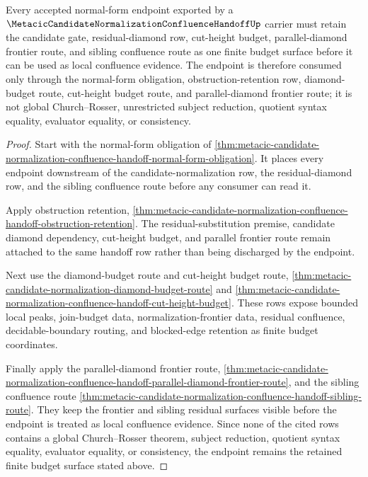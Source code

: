 \begin{theorem}
\label{thm:metacic-candidate-normalization-confluence-handoff-normal-form-budget}
Every accepted normal-form endpoint exported by a
$\MetacicCandidateNormalizationConfluenceHandoffUp$ carrier must retain the
candidate gate, residual-diamond row, cut-height budget, parallel-diamond
frontier route, and sibling confluence route as one finite budget surface before
it can be used as local confluence evidence. The endpoint is therefore consumed
only through the normal-form obligation, obstruction-retention row,
diamond-budget route, cut-height budget route, and parallel-diamond frontier
route; it is not global Church--Rosser, unrestricted subject reduction,
quotient syntax equality, evaluator equality, or consistency.
\end{theorem}
\begin{proof}
Start with the normal-form obligation of
\autoref{thm:metacic-candidate-normalization-confluence-handoff-normal-form-obligation}.
It places every endpoint downstream of the candidate-normalization row, the
residual-diamond row, and the sibling confluence route before any consumer can
read it.

Apply obstruction retention,
\autoref{thm:metacic-candidate-normalization-confluence-handoff-obstruction-retention}.
The residual-substitution premise, candidate diamond dependency, cut-height
budget, and parallel frontier route remain attached to the same handoff row
rather than being discharged by the endpoint.

Next use the diamond-budget route and cut-height budget route,
\autoref{thm:metacic-candidate-normalization-diamond-budget-route} and
\autoref{thm:metacic-candidate-normalization-confluence-handoff-cut-height-budget}.
These rows expose bounded local peaks, join-budget data, normalization-frontier
data, residual confluence, decidable-boundary routing, and blocked-edge
retention as finite budget coordinates.

Finally apply the parallel-diamond frontier route,
\autoref{thm:metacic-candidate-normalization-confluence-handoff-parallel-diamond-frontier-route},
and the sibling confluence route
\autoref{thm:metacic-candidate-normalization-confluence-handoff-sibling-route}.
They keep the frontier and sibling residual surfaces visible before the
endpoint is treated as local confluence evidence. Since none of the cited rows
contains a global Church--Rosser theorem, subject reduction, quotient syntax
equality, evaluator equality, or consistency, the endpoint remains the retained
finite budget surface stated above.
\end{proof}

